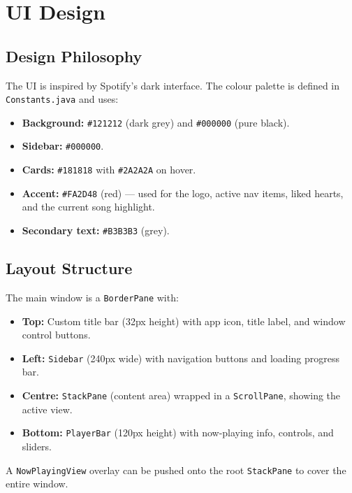 ﻿\documentclass[12pt]{report}
\begin{document}
\newpage
\chapter{UI Design}

\section{Design Philosophy}
The UI is inspired by Spotify's dark interface. The colour palette is defined in \texttt{Constants.java} and uses:
\begin{itemize}
    \item \textbf{Background:} \texttt{\#121212} (dark grey) and \texttt{\#000000} (pure black).
    \item \textbf{Sidebar:} \texttt{\#000000}.
    \item \textbf{Cards:} \texttt{\#181818} with \texttt{\#2A2A2A} on hover.
    \item \textbf{Accent:} \texttt{\#FA2D48} (red) --- used for the logo, active nav items, liked hearts, and the current song highlight.
    \item \textbf{Secondary text:} \texttt{\#B3B3B3} (grey).
\end{itemize}

\section{Layout Structure}
The main window is a \texttt{BorderPane} with:
\begin{itemize}
    \item \textbf{Top:} Custom title bar (32px height) with app icon, title label, and window control buttons.
    \item \textbf{Left:} \texttt{Sidebar} (240px wide) with navigation buttons and loading progress bar.
    \item \textbf{Centre:} \texttt{StackPane} (content area) wrapped in a \texttt{ScrollPane}, showing the active view.
    \item \textbf{Bottom:} \texttt{PlayerBar} (120px height) with now-playing info, controls, and sliders.
\end{itemize}
A \texttt{NowPlayingView} overlay can be pushed onto the root \texttt{StackPane} to cover the entire window.
\end{document}
